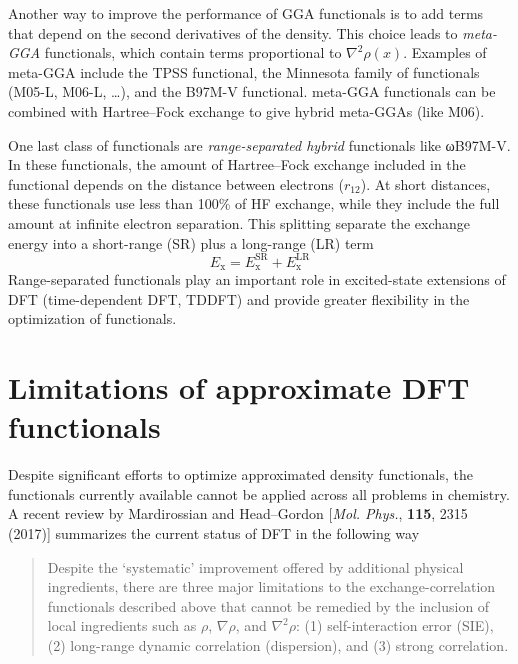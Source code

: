 \documentclass[../Main/notes.tex]{subfiles}
\begin{document}
Another way to improve the performance of GGA functionals is to add terms that depend on the second derivatives of the density.
This choice leads to \emph{meta-GGA} functionals, which contain terms proportional to $\nabla^2 \rho(x)$.
Examples of meta-GGA include the TPSS functional, the Minnesota family of functionals (M05-L, M06-L, \ldots), and the B97M-V functional.
meta-GGA functionals can be combined with Hartree--Fock exchange to give hybrid meta-GGAs (like M06).

One last class of functionals are \emph{range-separated hybrid} functionals like ωB97M-V.
In these functionals, the amount of Hartree--Fock exchange included in the functional depends on the distance between electrons ($r_{12}$).
At short distances, these functionals use less than 100\% of HF exchange, while they include the full amount at infinite electron separation.
This splitting separate the exchange energy into a short-range (SR) plus a long-range (LR) term
\begin{equation}
E_\mathrm{x} = E_\mathrm{x}^\mathrm{SR} + E_\mathrm{x}^\mathrm{LR}\end{equation}
Range-separated functionals play an important role in excited-state extensions of DFT (time-dependent DFT, TDDFT) and provide greater flexibility in the optimization of functionals.


\section{Limitations of approximate DFT functionals}

Despite significant efforts to optimize approximated density functionals, the functionals currently available cannot be applied across all problems in chemistry.
A recent review by Mardirossian and Head--Gordon [\textit{Mol. Phys.}, \textbf{115}, 2315 (2017)] summarizes the current status of DFT in the following way
\begin{quote}
Despite the `systematic' improvement offered by additional physical ingredients, there are three major limitations to the exchange-correlation functionals described above that cannot be remedied by the inclusion of local ingredients such as $\rho$, $\nabla \rho$, and $\nabla^2 \rho$: (1) self-interaction error (SIE), (2) long-range dynamic correlation (dispersion), and (3) strong correlation.
%
\end{quote}
\end{document}
